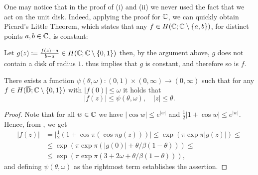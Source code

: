 \begin{remark}
    One may notice that in the proof of  (i) and (ii) we never used the fact that we act on the unit disk. Indeed, applying the proof for $\mathbb{C}$, we can quickly obtain Picard's Little Theorem, which states that any $f \in H(\mathbb{C}; \mathbb{C} \setminus \{ a, b \})$, for distinct points $a, b \in \mathbb{C}$, is constant:

    Let $g(z) \coloneqq \frac{f(z) - a}{b - a} \in H(\mathbb{C}; \mathbb{C} \setminus \{ 0, 1 \})$ then, by the argument above, $g$ does not contain a disk of radius $1$.  thus implies that $g$ is constant, and therefore so is $f$.
\end{remark}

\begin{theorem}[Schottky] \label{thm:schottky}
    There exists a function ${\psi(\theta, \omega) : (0, 1) \times (0, \infty) \to (0, \infty)}$ such that for any $f \in H(\overline{\mathbb{D}}; \mathbb{C} \setminus \{ 0, 1 \})$ with $\vert f(0) \vert \leq \omega$ it holds that
    \begin{equation}
        \vert f(z) \vert \leq \psi(\theta, \omega), \quad \vert z \vert \leq \theta.
    \end{equation}
\end{theorem}

\begin{proof}
    Note that for all $w \in \mathbb{C}$ we have $\vert \cos w \vert \leq e^{\vert w \vert}$ and $\frac{1}{2} \vert 1 + \cos w \vert \leq e^{\vert w \vert}$. Hence, from , we get
    \begin{align*}
        \vert f(z) \vert &= \vert {\textstyle \frac{1}{2}} ( 1 + \cos \pi ( \cos \pi g(z) ) ) \vert \leq \exp ( \pi \exp \pi \vert g(z) \vert ) \leq \\ &\leq \exp (\pi \exp \pi (\vert g(0) \vert + \theta / \beta(1 - \theta))) \leq \\
        &\leq \exp ( \pi \exp \pi ( 3 + 2 \omega + \theta / \beta(1 - \theta) ) ),
    \end{align*}
    and defining $\psi(\theta, \omega)$ as the rightmost term establishes the assertion.
\end{proof}